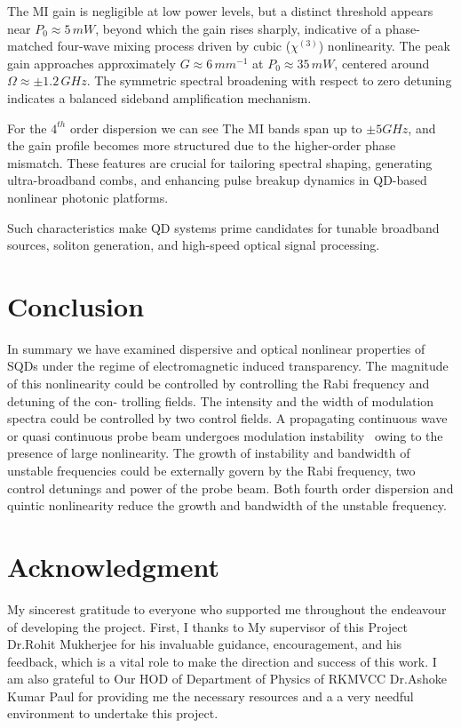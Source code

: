 \documentclass[12pt,a4paper]{article}
\begin{document}
The MI gain is negligible at low power levels, but a distinct threshold appears near \( P_0 \approx 5 \, {mW} \), beyond which the gain rises sharply, indicative of a phase-matched four-wave mixing process driven by cubic (\( \chi^{(3)} \)) nonlinearity. The peak gain approaches approximately \( G \approx 6 \, {mm^{-1}} \) at \( P_0 \approx 35 \, {mW} \), centered around \( \Omega \approx \pm 1.2 \, {GHz} \). The symmetric spectral broadening with respect to zero detuning indicates a balanced sideband amplification mechanism.

For the \(4^{th}\) order dispersion we can see The MI bands span up to $\pm5GHz$, and the gain profile becomes more structured due to the higher-order phase mismatch. These features are crucial for tailoring spectral shaping, generating ultra-broadband combs, and enhancing pulse breakup dynamics in QD-based nonlinear photonic platforms.

Such characteristics make QD systems prime candidates for tunable broadband sources, soliton generation, and high-speed optical signal processing.
\newpage

\section{Conclusion}
In summary we have examined dispersive and optical nonlinear properties of SQDs under the regime of electromagnetic induced transparency. The magnitude of this nonlinearity could be controlled by controlling the Rabi frequency and detuning of the con- trolling fields. The intensity and the width of modulation spectra could be controlled by two control fields. A propagating continuous wave or quasi continuous probe beam undergoes modulation instability~\cite{lighthall} owing to the presence of large nonlinearity. The growth of instability and bandwidth of unstable frequencies could be externally govern by the Rabi frequency, two control detunings and power of the probe beam. Both fourth order dispersion and quintic nonlinearity reduce the growth and bandwidth of the unstable frequency.

\newpage
\section*{Acknowledgment}
My sincerest gratitude to everyone who supported me throughout the endeavour of developing the project. First, I thanks to My supervisor of this Project Dr.Rohit Mukherjee for his invaluable guidance, encouragement, and his feedback, which is a vital role to make the direction and success of this work. I am also grateful to Our HOD of Department of Physics of RKMVCC Dr.Ashoke Kumar Paul for providing me the necessary resources and a a very needful environment to undertake this project.

\newpage


\end{document}
